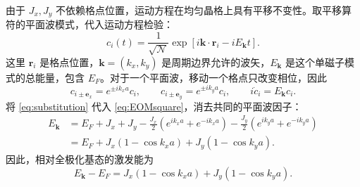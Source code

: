 \documentclass[UTF8,11pt,a4paper,fontset=fandol]{ctexart}
\begin{document}
由于 $J_x,J_y$ 不依赖格点位置，运动方程在均匀晶格上具有平移不变性。取平移算符的平面波模式，代入运动方程检验：
\begin{equation}
c_i(t)=\frac1{\sqrt{\mathcal N}}
\exp\!\left[i\mathbf k\cdot\mathbf r_i-iE_{\mathbf k}t\right].
\label{eq:planewave}
\end{equation}
这里 $\mathbf r_i$ 是格点位置，$\mathbf k=(k_x,k_y)$ 是周期边界允许的波矢，$E_{\mathbf k}$ 是这个单磁子模式的总能量，包含 $E_F$。对于一个平面波，移动一个格点只改变相位，因此
\begin{equation}
c_{i\pm\mathbf e_x}=e^{\pm ik_xa}c_i,\qquad
c_{i\pm\mathbf e_y}=e^{\pm ik_ya}c_i,\qquad
i\dot c_i=E_{\mathbf k}c_i.
\label{eq:substitution}
\end{equation}
将 \eqref{eq:substitution} 代入 \eqref{eq:EOMsquare}，消去共同的平面波因子：
\begin{equation}
\begin{aligned}
E_{\mathbf k}
&=E_F+J_x+J_y
-\frac{J_x}{2}(e^{ik_xa}+e^{-ik_xa})
-\frac{J_y}{2}(e^{ik_ya}+e^{-ik_ya})\\
&=E_F+J_x(1-\cos k_xa)+J_y(1-\cos k_ya).
\end{aligned}
\end{equation}
因此，相对全极化基态的激发能为
\begin{equation}
\boxed{
E_{\mathbf k}-E_F
=J_x(1-\cos k_xa)+J_y(1-\cos k_ya).
}
\end{equation}
\end{document}

